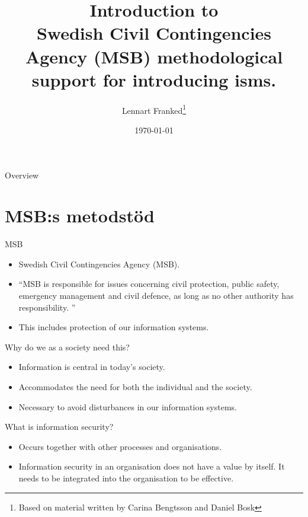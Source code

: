 \documentclass{beamer}
\title[Intro infosäk]{%
  Introduction to\\
  Swedish Civil Contingencies Agency (MSB) methodological support for introducing \ac{isms}.
}
\author{Lennart Franked\footnote{Based on material written by
    Carina Bengtsson and Daniel Bosk}}
\institute[MIUN IST]{%
  Department of Informationsystem and Technologies (IST),\\
  Mid Sweden University, Sundsvall.

}
\date{\today}
\begin{document}
\begin{frame}
  \titlepage{}
\end{frame}

\begin{frame}{Overview}
	\tableofcontents
\end{frame}

\section[Metodstöd]{MSB:s metodstöd}

\begin{frame}{MSB}
  \begin{itemize}
    \item Swedish Civil Contingencies Agency (MSB).
    \item \enquote{MSB is responsible for issues concerning civil protection,
        public safety, emergency management and civil defence, as long as no
        other authority has responsibility\cite[About MSB]{msbse}\@.
        }
    \item This includes protection of our information systems.
  \end{itemize}
\end{frame}

\begin{frame}{Why do we as a society need this?}
  \begin{itemize}
    \item Information is central in today's society.
    \item Accommodates the need for both the individual and the society.
    \item Necessary to avoid disturbances in our information systems.
  \end{itemize}
\end{frame}

\begin{frame}
\end{frame}

\begin{frame}{What is information security?}
  \begin{itemize}
    \item Occurs together with other processes and organisations.
    \item Information security in an organisation does not have a value by
      itself. It needs to be integrated into the organisation to be effective.
  \end{itemize}
\end{frame}
\end{document}
